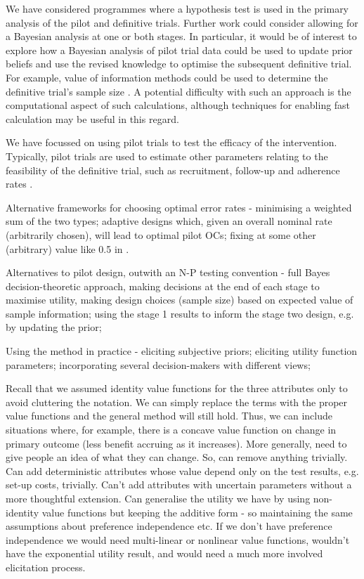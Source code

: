 \documentclass[sagev, Crown]{sagej}
\begin{document}



We have considered programmes where a hypothesis test is used in the primary analysis of the pilot and definitive trials. Further work could consider allowing for a Bayesian analysis at one or both stages. In particular, it would be of interest to explore how a Bayesian analysis of pilot trial data could be used to update prior beliefs and use the revised knowledge to optimise the subsequent definitive trial. For example, value of information methods could be used to determine the definitive trial's sample size \cite{Willan2005}. A potential difficulty with such an approach is the computational aspect of such calculations, although techniques for enabling fast calculation may be useful in this regard\cite{Strong2015}. 

We have focussed on using pilot trials to test the efficacy of the intervention. Typically, pilot trials are used to estimate other parameters relating to the feasibility of the definitive trial, such as recruitment, follow-up and adherence rates \cite{Avery2017}.



Alternative frameworks for choosing optimal error rates - minimising a weighted sum of the two types; adaptive designs which, given an overall nominal rate (arbitrarily chosen), will lead to optimal pilot OCs; fixing at some other (arbitrary) value like 0.5 in \cite{Cocks2013}.

Alternatives to pilot design, outwith an N-P testing convention - full Bayes decision-theoretic approach, making decisions at the end of each stage to maximise utility, making design choices (sample size) based on expected value of sample information; using the stage 1 results to inform the stage two design, e.g. by updating the prior;

Using the method in practice - eliciting subjective priors; eliciting utility function parameters; incorporating several decision-makers with different views;

Recall that we assumed identity value functions for the three attributes only to avoid cluttering the notation. We can simply replace the terms with the proper value functions and the general method will still hold. Thus, we can include situations where, for example, there is a concave value function on change in primary outcome (less benefit accruing as it increases). More generally, need to give people an idea of what they can change. So, can remove anything trivially. Can add deterministic attributes whose value depend only on the test results, e.g. set-up costs, trivially. Can't add attributes with uncertain parameters without a more thoughtful extension. Can generalise the utility we have by using non-identity value functions but keeping the additive form - so maintaining the same assumptions about preference independence etc. If we don't have preference independence we would need multi-linear or nonlinear value functions, wouldn't have the exponential utility result, and would need a much more involved elicitation process.
\end{document}
